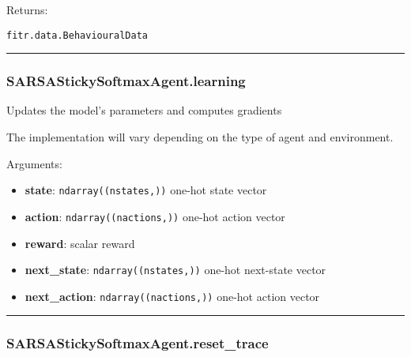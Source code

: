 Returns:

\texttt{fitr.data.BehaviouralData}

\begin{center}\rule{0.5\linewidth}{\linethickness}\end{center}

\subsubsection{SARSAStickySoftmaxAgent.learning}\label{sarsastickysoftmaxagent.learning}

\begin{Shaded}
\begin{Highlighting}[]
\end{Highlighting}
\end{Shaded}

Updates the model's parameters and computes gradients

The implementation will vary depending on the type of agent and
environment.

Arguments:

\begin{itemize}
\tightlist
\item
  \textbf{state}: \texttt{ndarray((nstates,))} one-hot state vector
\item
  \textbf{action}: \texttt{ndarray((nactions,))} one-hot action vector
\item
  \textbf{reward}: scalar reward
\item
  \textbf{next\_state}: \texttt{ndarray((nstates,))} one-hot next-state
  vector
\item
  \textbf{next\_action}: \texttt{ndarray((nactions,))} one-hot action
  vector
\end{itemize}

\begin{center}\rule{0.5\linewidth}{\linethickness}\end{center}

\subsubsection{SARSAStickySoftmaxAgent.reset\_trace}\label{sarsastickysoftmaxagent.reset_trace}

\begin{Shaded}
\begin{Highlighting}[]
\OperatorTok{=}\NormalTok{)}
\end{Highlighting}
\end{Shaded}

